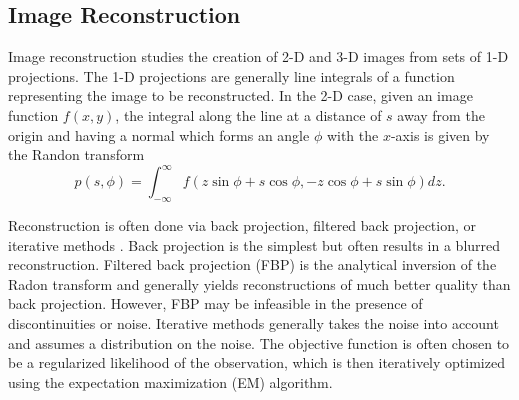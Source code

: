 %


\subsection{Image Reconstruction}
\label{sec:image_reconstruction}
Image reconstruction studies the creation of 2-D and 3-D images from sets
of 1-D projections. 
The 1-D projections are generally line integrals of a function representing the
image to be reconstructed.
In the 2-D case, given an image function $f(x, y)$, the integral along the line
at a distance of $s$ away from the origin and having a normal which forms an
angle $\phi$ with the $x$-axis is given by the Randon transform
\begin{equation}
	p(s, \phi) 
		= \int_{-\infty}^{\infty} f(z \sin \phi + s \cos \phi,
			-z \cos \phi + s \sin \phi) dz.
\end{equation}

Reconstruction is often done via back projection, filtered back projection, or
iterative methods \cite{natterer2001mathematical,herman2009fundamentals}.
Back projection is the simplest but often results in a blurred reconstruction.
Filtered back projection (FBP) is the analytical inversion of the Radon transform and
generally yields reconstructions of much better quality than back projection.
However, FBP may be infeasible in the presence of discontinuities or noise.
Iterative methods generally takes the noise into account and assumes a
distribution on the noise.
The objective function is often chosen to be a regularized likelihood of the
observation, which is then iteratively optimized using the expectation
maximization (EM) algorithm.


